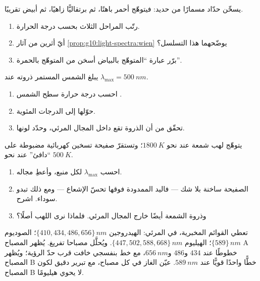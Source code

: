 \begin{exercise}[$\star$]\label{exo:g10:light-spectra:5}
يسخّن حدّاد مسمارًا من حديد: فيتوهّج أحمر باهتًا، ثم برتقاليًّا زاهيًا،
ثم أبيض تقريبًا.
\begin{enumerate}
  \item رتّب المراحل الثلاث بحسب درجة الحرارة.
  \item أيّ أثرين من آثار \cref{prop:g10:light-spectra:wien} يوضّحهما
        هذا التسلسل؟
  \item برّر عبارة ``المتوهّج بالبياض أسخن من المتوهّج بالحمرة''.
\end{enumerate}
\end{exercise}

\begin{exercise}[$\star\star$]\label{exo:g10:light-spectra:6}
يبلغ  الشمس المستمر ذروته عند $\lambda_{\max} = \qty{500}{nm}$.
\begin{enumerate}
  \item احسب درجة حرارة سطح الشمس .
  \item حوّلها إلى الدرجات المئوية.
  \item تحقّق من أن الذروة تقع داخل المجال المرئي، وحدّد
        لونها.
\end{enumerate}
\end{exercise}

\begin{exercise}[$\star\star$]\label{exo:g10:light-spectra:7}
يتوهّج لهب شمعة عند نحو $\qty{1800}{K}$؛ وتستقرّ صفيحة تسخين كهربائية مضبوطة
على ``دافئ'' عند نحو $\qty{500}{K}$.
\begin{enumerate}
  \item احسب $\lambda_{\max}$ لكل منبع، وأعطِ مجاله.
  \item الصفيحة ساخنة بلا شك --- فاليد الممدودة فوقها تحسّ
        الإشعاع --- ومع ذلك تبدو سوداء. اشرح.
  \item وذروة الشمعة أيضًا خارج المجال المرئي. فلماذا نرى
        اللهب أصلًا؟
\end{enumerate}
\end{exercise}

\begin{exercise}[$\star\star$]\label{exo:g10:light-spectra:8}
تعطي القوائم المخبرية، في المرئي: الهيدروجين
$\{410, 434, 486, 656\}\,\unit{nm}$؛ الصوديوم $\{589\}\,\unit{nm}$؛ الهيليوم
$\{447, 502, 588, 668\}\,\unit{nm}$. ويُحلَّل مصباحا تفريغ.
يُظهر المصباح A خطوطًا عند $434$ و$486$ و$\qty{656}{nm}$، مع
خط بنفسجي خافت قرب حدّ الرؤية؛ ويُظهر المصباح B خطًّا واحدًا قويًّا
عند $\qty{589}{nm}$. عيّن الغاز في كل مصباح، مع تبرير
دقيق لكون المصباح B لا يحوي هيليومًا.
\end{exercise}


